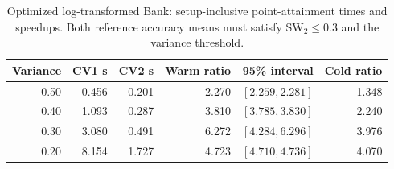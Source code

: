 \begin{table}[tb]
\centering\small
\caption{Optimized log-transformed Bank: setup-inclusive point-attainment times and speedups. Both reference accuracy means must satisfy SW$_2\leq0.3$ and the variance threshold.}\label{tab:log1p_speedup}
\begin{tabular}{rrrrrr}
\toprule
Variance & CV1 s & CV2 s & Warm ratio & 95\% interval & Cold ratio \\
\midrule
0.50 & 0.456 & 0.201 & 2.270 & $[2.259,2.281]$ & 1.348 \\
0.40 & 1.093 & 0.287 & 3.810 & $[3.785,3.830]$ & 2.240 \\
0.30 & 3.080 & 0.491 & 6.272 & $[4.284,6.296]$ & 3.976 \\
0.20 & 8.154 & 1.727 & 4.723 & $[4.710,4.736]$ & 4.070 \\
\bottomrule
\end{tabular}
\par{}
\end{table}
